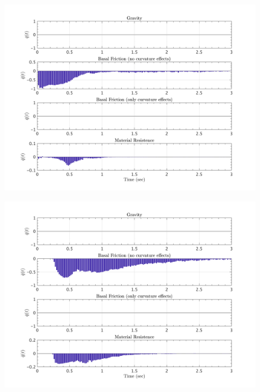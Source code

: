 \documentclass{article}
\begin{document}
\begin{figure}[H]
        \begin{minipage}[b]{0.5\linewidth}
                \centering
                \includegraphics[width=1\textwidth]{InclinedPlane/LocalRecords/ContribF1_V_y.png}
                \label{fig:Ramp-Vy1}
        \end{minipage}
        \begin{minipage}[b]{0.5\linewidth}
                \centering
                \includegraphics[width=1\textwidth]{InclinedPlane/LocalRecords/ContribF8_V_y.png}
                \label{fig:Ramp-Vy2}
        \end{minipage}


\end{figure}
\end{document}
